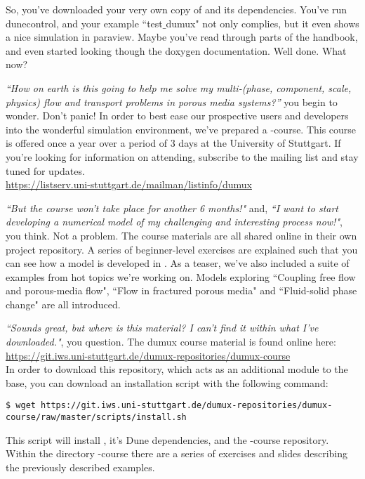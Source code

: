 So, you've downloaded your very own copy of \Dumux and its dependencies.
You've run dunecontrol, and your example ``test$\_$dumux" not only complies,
but it even shows a nice simulation in paraview. 
Maybe you've read through parts of the handbook, and even started looking 
though the doxygen documentation. 
Well done. What now? \\ \linebreak

\textit{``How on earth is this going to help me solve my multi-(phase, component, 
scale, physics) flow and transport problems in porous media systems?''} you begin to wonder. 
Don't panic! In order to best ease our prospective users and developers into the
wonderful \Dumux simulation environment, we've prepared a \Dumux-course. 
This course is offered once a year over a period of 3 days at the University of Stuttgart.
If you're looking for information on attending, subscribe to the \Dumux mailing list 
and stay tuned for updates. \\
\url{https://listserv.uni-stuttgart.de/mailman/listinfo/dumux} \\ \linebreak

\textit{``But the course won't take place for another 6 months!"} and, 
\textit{``I want to start developing a numerical model of my challenging and 
	interesting process now!"}, you think. 
Not a problem. The course materials are all shared online in their own 
\Dumux project repository. A series of beginner-level exercises are explained 
such that you can see how a model is developed in \Dumux. As a teaser, we've
 also included a suite of examples from hot topics we're working on. Models
  exploring ``Coupling free flow and porous-media flow", ``Flow in fractured
   porous media" and ``Fluid-solid phase change" are all introduced.  \\ \linebreak
   
\textit{``Sounds great, but where is this material? I can't find it within
what I've downloaded."}, you question. 
The dumux course material is found online here: \\
\url{https://git.iws.uni-stuttgart.de/dumux-repositories/dumux-course} \\
In order to download this repository, which acts as an additional module to 
the \Dumux base, you can download an installation script with the following command:
\begin{lstlisting}[style=Bash]
$ wget https://git.iws.uni-stuttgart.de/dumux-repositories/dumux-course/raw/master/scripts/install.sh
\end{lstlisting}
This script will install \Dumux, it's Dune dependencies, and the \Dumux-course 
repository. Within the directory \Dumux-course there are a series of exercises 
and slides describing the previously described examples. \\ \linebreak

